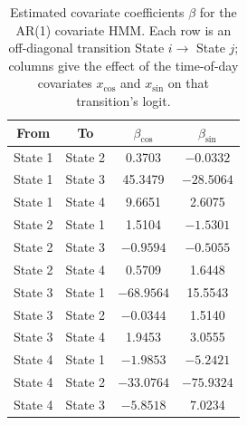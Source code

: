 \begin{table}[ht]
\centering
\begin{tabular}{cccc}
\hline
From & To & $\beta_{\cos}$ & $\beta_{\sin}$ \\
\hline
State 1 & State 2 & 0.3703 & $-0.0332$ \\
State 1 & State 3 & 45.3479 & $-28.5064$ \\
State 1 & State 4 & 9.6651 & 2.6075 \\
\hline
State 2 & State 1 & 1.5104 & $-1.5301$ \\
State 2 & State 3 & $-0.9594$ & $-0.5055$ \\
State 2 & State 4 & 0.5709 & 1.6448 \\
\hline
State 3 & State 1 & $-68.9564$ & 15.5543 \\
State 3 & State 2 & $-0.0344$ & 1.5140 \\
State 3 & State 4 & 1.9453 & 3.0555 \\
\hline
State 4 & State 1 & $-1.9853$ & $-5.2421$ \\
State 4 & State 2 & $-33.0764$ & $-75.9324$ \\
State 4 & State 3 & $-5.8518$ & 7.0234 \\
\hline
\end{tabular}
\caption{Estimated covariate coefficients $\beta$ for the AR(1) covariate HMM. Each row is an off-diagonal transition State $i \to$ State $j$; columns give the effect of the time-of-day covariates $x_{\cos}$ and $x_{\sin}$ on that transition's logit.}
\label{tab:ar_1_covariate_hmm_beta}
\end{table}
